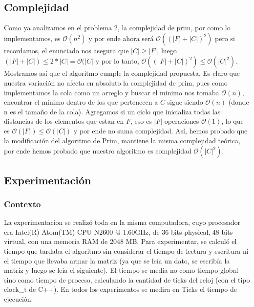 \documentclass[A4paper,oneside,fleqn,11pt]{article}
\theoremstyle{definition}
\begin{document}
\subsection{Complejidad}

Como ya analizamos en el problema 2, la complejidad de prim, por como lo implementamos, es $\mathcal{O} (n^2)$ y por ende ahora será $\mathcal{O} ((|F|+|C|)^2)$ pero si recordamos, el enunciado nos asegura que $|C| \geq |F|$, luego $(|F|+|C|) \leq 2 *|C| = \mathcal{O} (|C|$ y por lo tanto, $\mathcal{O} ((|F|+|C|)^2) \leq \mathcal{O} (|C|^2)$. Mostramos así que el algoritmo cumple la complejidad propuesta. Es claro que nuestra variación no afecta en absoluto la complejidad de prim, pues como implementamos la cola como un arreglo y buscar el minimo nos tomaba $\mathcal{O} (n)$, encontrar el minimo dentro de los que pertenecen a $C$ sigue siendo $\mathcal{O} (n)$ (donde n es el tamaño de la cola). Agregamos si un ciclo que inicializa todas las distancias de los elementos que estan en $F$, eso es $|F|$ operaciones $\mathcal{O} (1)$, lo que es $\mathcal{O} (|F|) \leq \mathcal{O} (|C|)$ y por ende no suma complejidad. Así, hemos probado que la modificación del algoritmo de Prim, mantiene la misma complejidad teórica, por ende hemos probado que nuestro algoritmo es complejidad $\mathcal{O} (|C|^2)$.

\subsection{Experimentación}

\subsubsection{Contexto}
La experimentacion se realizó toda en la misma computadora, cuyo procesador era Intel(R) Atom(TM) CPU N2600 @ 1.60GHz, de 36 bits physical, 48 bits virtual, con una memoria RAM de 2048 MB.  Para experimentar, se calculó el tiempo que tardaba el algoritmo sin considerar el tiempo de lectura y escritura ni el tiempo que llevaba armar la matriz (ya que se leía un dato, se escribía la matriz y luego se leia el siguiente). 
El tiempo se medía no como tiempo global sino como tiempo de proceso, calculando la cantidad de ticks del reloj (con el tipo clock\_t de C++). En todos los experimentos se medira en Ticks el tiempo de ejecución.
\end{document}
